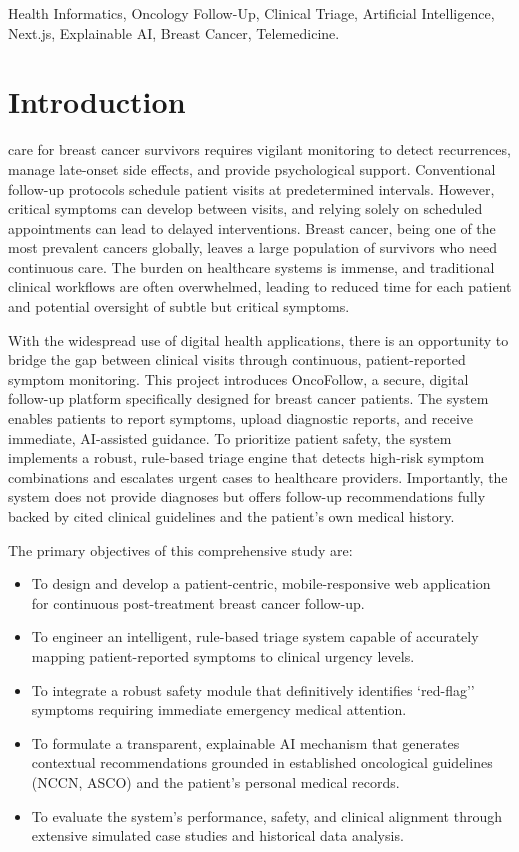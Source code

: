 \documentclass[10pt,journal,compsoc]{IEEEtran}
\begin{document}
\begin{IEEEkeywords}
Health Informatics, Oncology Follow-Up, Clinical Triage, Artificial Intelligence, Next.js, Explainable AI, Breast Cancer, Telemedicine.
\end{IEEEkeywords}

\section{Introduction}
 care for breast cancer survivors requires vigilant monitoring to detect recurrences, manage late-onset side effects, and provide psychological support. Conventional follow-up protocols schedule patient visits at predetermined intervals. However, critical symptoms can develop between visits, and relying solely on scheduled appointments can lead to delayed interventions. Breast cancer, being one of the most prevalent cancers globally, leaves a large population of survivors who need continuous care. The burden on healthcare systems is immense, and traditional clinical workflows are often overwhelmed, leading to reduced time for each patient and potential oversight of subtle but critical symptoms.

With the widespread use of digital health applications, there is an opportunity to bridge the gap between clinical visits through continuous, patient-reported symptom monitoring. This project introduces OncoFollow, a secure, digital follow-up platform specifically designed for breast cancer patients. The system enables patients to report symptoms, upload diagnostic reports, and receive immediate, AI-assisted guidance. To prioritize patient safety, the system implements a robust, rule-based triage engine that detects high-risk symptom combinations and escalates urgent cases to healthcare providers. Importantly, the system does not provide diagnoses but offers follow-up recommendations fully backed by cited clinical guidelines and the patient's own medical history.

The primary objectives of this comprehensive study are:
\begin{itemize}
    \item To design and develop a patient-centric, mobile-responsive web application for continuous post-treatment breast cancer follow-up.
    \item To engineer an intelligent, rule-based triage system capable of accurately mapping patient-reported symptoms to clinical urgency levels.
    \item To integrate a robust safety module that definitively identifies `red-flag'' symptoms requiring immediate emergency medical attention.
    \item To formulate a transparent, explainable AI mechanism that generates contextual recommendations grounded in established oncological guidelines (NCCN, ASCO) and the patient's personal medical records.
    \item To evaluate the system's performance, safety, and clinical alignment through extensive simulated case studies and historical data analysis.
\end{itemize}
\end{document}
